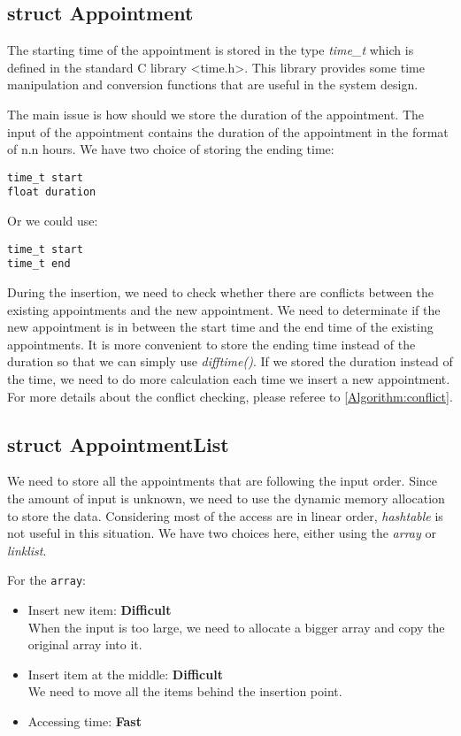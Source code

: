 \documentclass[12pt,a4paper]{report}
\begin{document}
\subsection{struct Appointment}
The starting time of the appointment is stored in the type \textit{time\_t} which is defined in the standard C library \textless time.h\textgreater. This library provides some time manipulation and conversion functions that are useful in the system design.

The main issue is how should we store the duration of the appointment. The input of the appointment contains the duration of the appointment in the format of n.n hours. We have two choice of storing the ending time:
\begin{lstlisting}
time_t start
float duration
\end{lstlisting}
Or we could use:
\begin{lstlisting}
time_t start
time_t end
\end{lstlisting}

During the insertion, we need to check whether there are conflicts between the existing appointments and the new appointment. We need to determinate if the new appointment is in between the start time and the end time of the existing appointments. It is more convenient to store the ending time instead of the duration so that we can simply use \textit{difftime()}. If we stored the duration instead of the time, we need to do more calculation each time we insert a new appointment. For more details about the conflict checking, please referee to \autoref{Algorithm:conflict}.

\subsection{struct AppointmentList}
We need to store all the appointments that are following the input order. Since the amount of input is unknown, we need to use the dynamic memory allocation to store the data. Considering most of the access are in linear order, \textit{hashtable} is not useful in this situation. We have two choices here, either using the \textit{array} or \textit{linklist}.

For the \texttt{array}:
\begin{itemize}
\item Insert new item: \textbf{Difficult} \\ When the input is too large, we need to allocate a bigger array and copy the original array into it.
\item Insert item at the middle: \textbf{Difficult} \\ We need to move all the items behind the insertion point.
\item Accessing time: \textbf{Fast}
\end{itemize}
\end{document}
